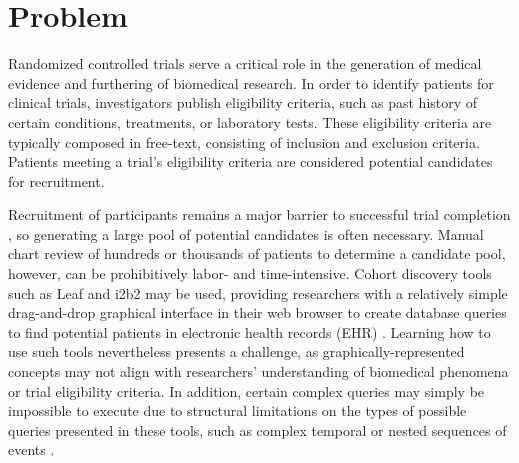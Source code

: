 \documentclass[../main.tex]{subfiles}
\begin{document}
\section{Problem}

Randomized controlled trials serve a critical role in the generation of medical evidence and furthering of biomedical research. In order to identify patients for clinical trials, investigators publish eligibility criteria, such as past history of certain conditions, treatments, or laboratory tests. These eligibility criteria are typically composed in free-text, consisting of inclusion and exclusion criteria. Patients meeting a trial's eligibility criteria are considered potential candidates for recruitment. 

Recruitment of participants remains a major barrier to successful trial completion \cite{richesson2013electronic}, so generating a large pool of potential candidates is often necessary. Manual chart review of hundreds or thousands of patients to determine a candidate pool, however, can be prohibitively labor- and time-intensive. Cohort discovery tools such as Leaf \cite{dobbins2019leaf} and i2b2 \cite{murphy2010serving} may be used, providing researchers with a relatively simple drag-and-drop graphical interface in their web browser to create database queries to find potential patients in electronic health records (EHR) \cite{johnson2014use}. Learning how to use such tools nevertheless presents a challenge, as graphically-represented concepts may not align with researchers' understanding of biomedical phenomena or trial eligibility criteria. In addition, certain complex queries may simply be impossible to execute due to structural limitations on the types of possible queries presented in these tools, such as complex temporal or nested sequences of events \cite{deshmukh2009evaluating}.
\end{document}
